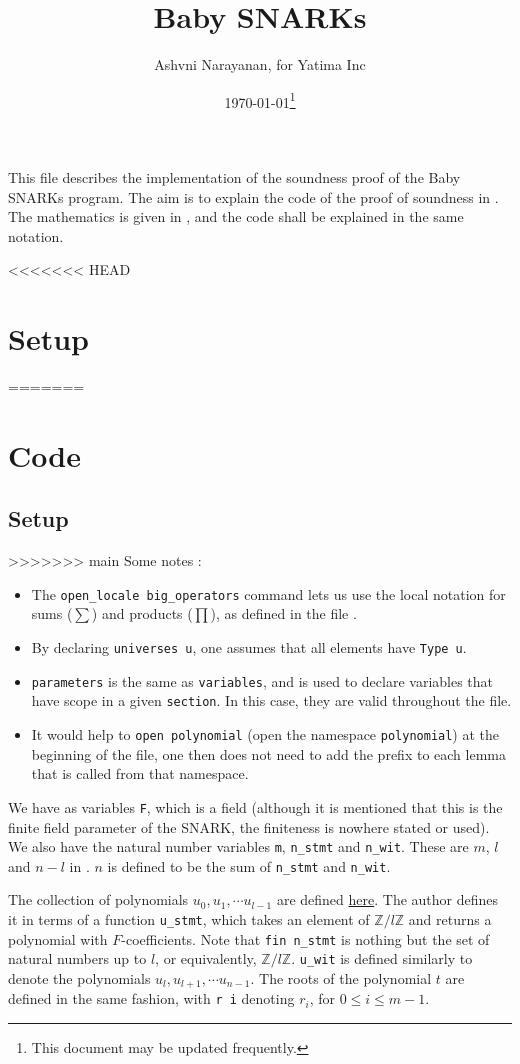 \documentclass{article}
\title{Baby SNARKs}
\author{Ashvni Narayanan, for Yatima Inc}
\date{\today\footnote{This document may be updated frequently.}}
\theoremstyle{definition}
\theoremstyle{remark}
\begin{document}
\maketitle

This file describes the implementation of the soundness proof of the Baby SNARKs program. The aim is to explain the code of the proof of soundness in \cite{code}. The mathematics is given in \cite{main}, and the code shall be explained in the same notation.

<<<<<<< HEAD
\section{Setup}
=======
\section{Code}
\subsection{Setup}
>>>>>>> main
Some notes :
\begin{itemize}
  \item The \texttt{open\_locale big\_operators} command lets us use the local notation for sums ($\sum$) and products ($\prod$), as defined in the file \cite{big_operators}.
  \item By declaring \texttt{universes u}, one assumes that all elements have \texttt{Type u}.
  \item \texttt{parameters} is the same as \texttt{variables}, and is used to declare variables that have scope in a given \texttt{section}. In this case, they are valid throughout the file.
  \item It would help to \texttt{open polynomial} (open the namespace \texttt{polynomial}) at the beginning of the file, one then does not need to add the prefix to each lemma that is called from that namespace.
\end{itemize}

We have as variables \texttt{F}, which is a field (although it is mentioned that this is the finite field parameter of the SNARK, the finiteness is nowhere stated or used). We also 
have the natural number variables \texttt{m}, \texttt{n\_stmt} and \texttt{n\_wit}. These are $m$, $l$ and $n - l$ in \cite{main}. $n$ is defined to be the sum of \texttt{n\_stmt} and \texttt{n\_wit}. 

The collection of polynomials $u_0, u_1, \cdots u_{l - 1}$ are defined \href{https://github.com/BoltonBailey/formal-snarks-project/blob/7fd9cd122f5887f88f6a706b4f2a68a7153c7381/src/snarks/babysnark/knowledge_soundness.lean#L59}{here}. 
The author defines it in terms of a function \texttt{u\_stmt}, which takes an element of $\mathbb{Z}/l \mathbb{Z}$ and returns a polynomial with $F$-coefficients. Note that \texttt{fin n\_stmt} is nothing but the set of natural numbers 
up to $l$, or equivalently, $\mathbb{Z}/l \mathbb{Z}$. \texttt{u\_wit} is defined similarly to denote the polynomials $u_l, u_{l + 1}, \cdots u_{n - 1}$. The roots of the polynomial $t$ are defined in the same fashion, with 
\texttt{r i} denoting $r_i$, for $0 \le i \le m - 1$. 
\end{document}
